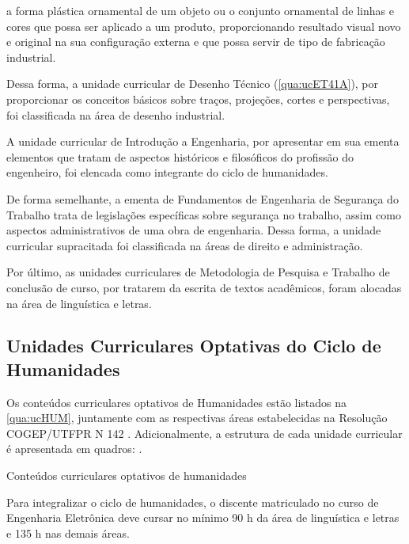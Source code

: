 \begin{citacao}
	a forma plástica ornamental de um objeto ou o conjunto ornamental de linhas e cores que possa ser aplicado a um produto, proporcionando resultado visual novo e original na sua configuração externa e que possa servir de tipo de fabricação industrial.
\end{citacao}

Dessa forma, a unidade curricular de Desenho Técnico (\autoref{qua:ucET41A}), por proporcionar os conceitos básicos sobre traços, projeções, cortes e perspectivas, foi classificada na área de desenho industrial.

A unidade curricular de Introdução a Engenharia, por apresentar em sua ementa elementos que tratam de aspectos históricos e filosóficos do profissão do engenheiro, foi elencada como integrante do ciclo de humanidades.

De forma semelhante, a ementa de Fundamentos de Engenharia de Segurança do Trabalho trata de legislações específicas sobre segurança no trabalho, assim como aspectos administrativos de uma obra de engenharia. Dessa forma, a unidade curricular supracitada foi classificada na áreas de direito e administração.

Por último, as unidades curriculares de Metodologia de Pesquisa e Trabalho de conclusão de curso, por tratarem da escrita de textos acadêmicos, foram alocadas na área de linguística e letras.


\subsection{Unidades Curriculares Optativas do Ciclo de Humanidades}
\label{subsec:opthumanidades}

Os conteúdos curriculares optativos de Humanidades estão listados na \autoref{qua:ucHUM}, juntamente com as respectivas áreas estabelecidas na Resolução COGEP/UTFPR N\textordmasculine{} 142 \cite{cogep142}. Adicionalmente, a estrutura de cada unidade curricular é apresentada em quadros: .

\begin{table}[!htb]
	\centering\footnotesize
	\caption{Conteúdos curriculares optativos de humanidades}
	\label{qua:ucHUM} %
\end{table}

Para integralizar o ciclo de humanidades, o discente matriculado no curso de Engenharia Eletrônica deve cursar no mínimo 90 h da área de linguística e letras e 135 h nas demais áreas.


